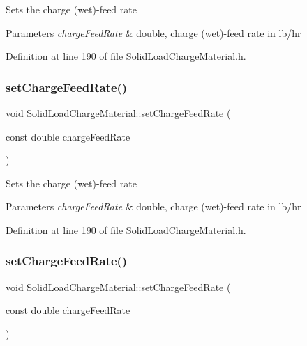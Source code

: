 Sets the charge (wet)-\/feed rate 
\begin{DoxyParams}{Parameters}
{\em charge\+Feed\+Rate} & double, charge (wet)-\/feed rate in lb/hr \\
\hline
\end{DoxyParams}


Definition at line 190 of file Solid\+Load\+Charge\+Material.\+h.

\mbox{\label{class_solid_load_charge_material_adc50117256b714789f68097437ca658d}} 
\subsubsection{\texorpdfstring{set\+Charge\+Feed\+Rate()}{setChargeFeedRate()}\hspace{0.1cm}{\footnotesize\ttfamily [2/3]}}
{\footnotesize\ttfamily void Solid\+Load\+Charge\+Material\+::set\+Charge\+Feed\+Rate (\begin{DoxyParamCaption}\item[{const double}]{charge\+Feed\+Rate }\end{DoxyParamCaption})\hspace{0.3cm}{\ttfamily [inline]}}

Sets the charge (wet)-\/feed rate 
\begin{DoxyParams}{Parameters}
{\em charge\+Feed\+Rate} & double, charge (wet)-\/feed rate in lb/hr \\
\hline
\end{DoxyParams}


Definition at line 190 of file Solid\+Load\+Charge\+Material.\+h.

\mbox{\label{class_solid_load_charge_material_adc50117256b714789f68097437ca658d}} 
\subsubsection{\texorpdfstring{set\+Charge\+Feed\+Rate()}{setChargeFeedRate()}\hspace{0.1cm}{\footnotesize\ttfamily [3/3]}}
{\footnotesize\ttfamily void Solid\+Load\+Charge\+Material\+::set\+Charge\+Feed\+Rate (\begin{DoxyParamCaption}\item[{const double}]{charge\+Feed\+Rate }\end{DoxyParamCaption})\hspace{0.3cm}{\ttfamily [inline]}}

